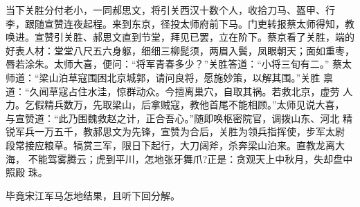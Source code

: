 当下关胜分付老小，一同郝思文，将引关西汉十数个人，收拾刀马、盔甲、行
李，跟随宣赞连夜起程。来到东京，径投太师府前下马。门吏转报蔡太师得知，教
唤进。宣赞引关胜、郝思文直到节堂，拜见已罢，立在阶下。蔡京看了关胜，端的
好表人材：堂堂八尺五六身躯，细细三柳髭须，两眉入鬓，凤眼朝天；面如重枣，
唇若涂朱。太师大喜，便问：“将军青春多少？”关胜答道：“小将三旬有二。”
蔡太师道：“梁山泊草寇围困北京城郭，请问良将，愿施妙策，以解其围。”关胜
禀道：“久闻草寇占住水洼，惊群动众。今擅离巢穴，自取其祸。若救北京，虚劳
人力。乞假精兵数万，先取梁山，后拿贼寇，教他首尾不能相顾。”太师见说大喜，
与宣赞道：“此乃围魏救赵之计，正合吾心。”随即唤枢密院官，调拨山东、河北
精锐军兵一万五千，教郝思文为先锋，宣赞为合后，关胜为领兵指挥使，步军太尉
段常接应粮草。犒赏三军，限日下起行，大刀阔斧，杀奔梁山泊来。直教龙离大海，
不能驾雾腾云；虎到平川，怎地张牙舞爪?正是：贪观天上中秋月，失却盘中照殿
珠。

毕竟宋江军马怎地结果，且听下回分解。